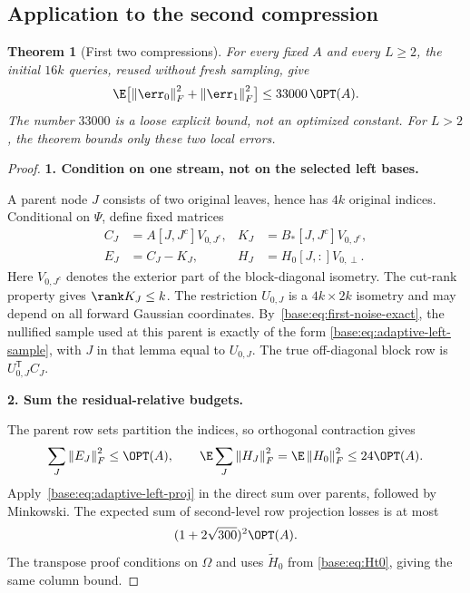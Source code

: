 \documentclass[11pt,oneside,openany,a4paper]{book}
\numberwithin{equation}{chapter}
\newtheorem{theorem}{Theorem}[chapter]
\theoremstyle{definition}
\theoremstyle{remark}
\newcommand{\proofstep}[1]{\par\addvspace{.45\baselineskip}\Needspace{3\baselineskip}\textbf{#1}\par\nobreak}
\newcommand{\T}{\mathsf T}\newcommand{\Id}{I}
\newcommand{\F}[1]{\left\lVert#1\right\rVert_F}
\begin{document}
\subsection{Application to the second compression}
\begin{theorem}[First two compressions]\label{base:thm:two-compressions}
For every fixed $A$ and every $L\ge2$, the initial $16k$ queries, reused
without fresh sampling, give
\begin{equation}\label{base:eq:two-compressions}
 \E\bigl[\F{\err_0}^2+\F{\err_1}^2\bigr]
 \le33000\,\OPT(A).
\end{equation}
The number $33000$ is a loose explicit bound, not an optimized constant.
For $L>2$, the theorem bounds only these two local errors.
\end{theorem}
\begin{proof}
\proofstep{1. Condition on one stream, not on the selected left bases.}
A parent node $J$ consists of two original leaves, hence has $4k$ original
indices. Conditional on $\Psi$, define fixed matrices
\begin{align*}
 C_J&=A[J,J^c]V_{0,J^c},&
 K_J&=B_*[J,J^c]V_{0,J^c},\\
 E_J&=C_J-K_J,&
 H_J&=H_0[J,:]V_{0,\perp}.
\end{align*}
Here $V_{0,J^c}$ denotes the exterior part of the block-diagonal isometry.
The cut-rank property gives $\rank K_J\le k$.
The restriction $U_{0,J}$ is a $4k\times2k$ isometry and may depend on all
forward Gaussian coordinates. By~\eqref{base:eq:first-noise-exact}, the
nullified sample used at this parent is exactly of the form
\eqref{base:eq:adaptive-left-sample}, with $J$ in that lemma equal to $U_{0,J}$.
The true off-diagonal block row is $U_{0,J}^{\T}C_J$.

\proofstep{2. Sum the residual-relative budgets.}
The parent row sets partition the indices, so orthogonal contraction gives
\begin{equation}\label{base:eq:parent-budgets}
 \sum_J\F{E_J}^2\le\OPT(A),\qquad
 \E\sum_J\F{H_J}^2=\E\F{H_0}^2\le24\OPT(A).
\end{equation}
Apply~\eqref{base:eq:adaptive-left-proj} in the direct sum over parents, followed
by Minkowski. The expected sum of second-level row projection losses is at
most
\begin{equation}\label{base:eq:second-projection}
 (1+2\sqrt{300})^2\OPT(A).
\end{equation}
The transpose proof conditions on $\Omega$ and uses $\widetilde H_0$ from
\eqref{base:eq:Ht0}, giving the same column bound.


\end{proof}
\end{document}
